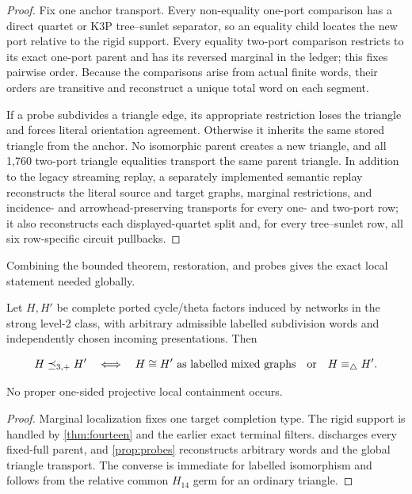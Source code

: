 \begin{proof}
Fix one anchor transport.  Every non-equality one-port comparison has a
direct quartet or K3P tree--sunlet separator, so an equality child locates the
new port relative to the rigid support.  Every equality two-port comparison
restricts to its exact one-port parent and has its reversed marginal in the
ledger; this fixes pairwise order.  Because the comparisons arise from actual
finite words, their orders are transitive and reconstruct a unique total word
on each segment.

If a probe subdivides a triangle edge, its appropriate restriction loses the
triangle and forces literal orientation agreement.  Otherwise it inherits
the same stored triangle from the anchor.  No isomorphic parent creates a new
triangle, and all 1,760 two-port triangle equalities transport the same
parent triangle.  In addition to the legacy streaming replay, a separately
implemented semantic replay reconstructs the literal source and target graphs,
marginal restrictions, and incidence- and arrowhead-preserving transports for
every one- and two-port row; it also reconstructs each displayed-quartet split
and, for every tree--sunlet row, all six row-specific circuit pullbacks.
\end{proof}

Combining the bounded theorem, restoration, and probes gives the exact local
statement needed globally.

\begin{theorem}\label{thm:local}
Let \(H,H'\) be complete ported cycle/theta factors induced by networks in the
strong level-2 class, with arbitrary admissible labelled subdivision words
and independently chosen incoming presentations.  Then

\[
 H\preceq_{3,+} H'
 \quad\Longleftrightarrow\quad
 H\cong H'\text{ as labelled mixed graphs}
 \quad\text{or}\quad H\equiv_\triangle H'.
\]

No proper one-sided projective local containment occurs.
\end{theorem}

\begin{proof}
Marginal localization fixes one target completion type.  The rigid support is
handled by \cref{thm:fourteen} and the earlier exact terminal filters.
 discharges every fixed-full parent, and
\cref{prop:probes} reconstructs arbitrary words and the global triangle
transport.  The converse is immediate for labelled isomorphism and follows
from the relative common \(H_{14}\) germ for an ordinary triangle.
\end{proof}
